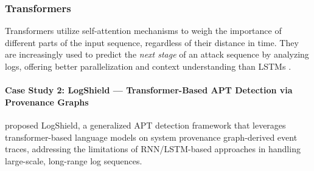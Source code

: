 \begin{table}[H]
\centering
\caption{Results for Independent Test (18.52\% Contamination) and Zero-Day Attack Test (19.93\% Contamination) }
\end{table}

\subsubsection{Transformers}
Transformers utilize self-attention mechanisms to weigh the importance of different parts of the input sequence, regardless of their distance in time. They are increasingly used to predict the \textit{next stage} of an attack sequence by analyzing logs, offering better parallelization and context understanding than LSTMs .

\paragraph{Case Study 2: LogShield --- Transformer-Based APT Detection via Provenance Graphs \protect\cite{anjum2023logshield}}

\cite{anjum2023logshield} proposed LogShield, a generalized APT detection framework that leverages transformer-based language models on system provenance graph-derived event traces, addressing the limitations of RNN/LSTM-based approaches in handling large-scale, long-range log sequences.

